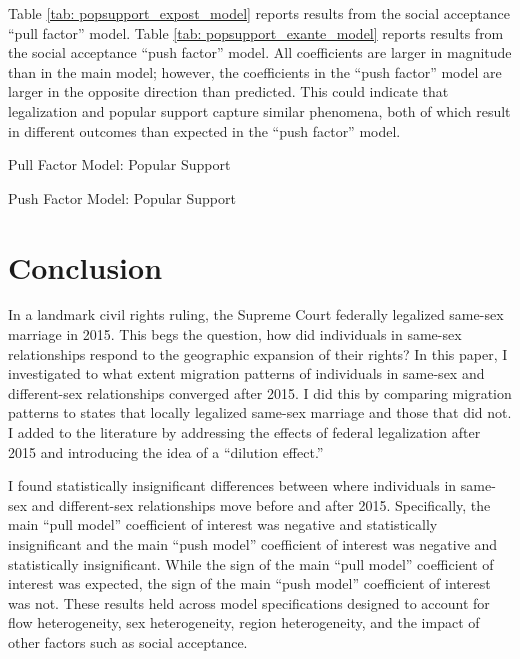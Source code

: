 \documentclass[12pt,letterpaper]{article}
\begin{document}
Table \ref{tab: popsupport_expost_model} reports results from the social acceptance “pull factor” model. Table \ref{tab: popsupport_exante_model} reports results from the social acceptance “push factor” model. All coefficients are larger in magnitude than in the main model; however, the coefficients in the “push factor” model are larger in the opposite direction than predicted. This could indicate that legalization and popular support capture similar phenomena, both of which result in different outcomes than expected in the “push factor” model.

\begin{table}[h] %
    \centering
    \caption{Pull Factor Model: Popular Support}
    \label{tab: popsupport_expost_model}
    
\end{table}
\begin{table}[h]
    \centering
    \caption{Push Factor Model: Popular Support}
    \label{tab: popsupport_exante_model}
    
\end{table}

\section{Conclusion}

In a landmark civil rights ruling, the Supreme Court federally legalized same-sex marriage in 2015. This begs the question, how did individuals in same-sex relationships respond to the geographic expansion of their rights? In this paper, I investigated to what extent migration patterns of individuals in same-sex and different-sex relationships converged after 2015. I did this by comparing migration patterns to states that locally legalized same-sex marriage and those that did not. I added to the literature by addressing the effects of federal legalization after 2015 and introducing the idea of a “dilution effect.”

I found statistically insignificant differences between where individuals in same-sex and different-sex relationships move before and after 2015. Specifically, the main “pull model” coefficient of interest was negative and statistically insignificant and the main “push model” coefficient of interest was negative and statistically insignificant. While the sign of the main “pull model” coefficient of interest was expected, the sign of the main “push model” coefficient of interest was not. These results held across model specifications designed to account for flow heterogeneity, sex heterogeneity, region heterogeneity, and the impact of other factors such as social acceptance. 
\end{document}
